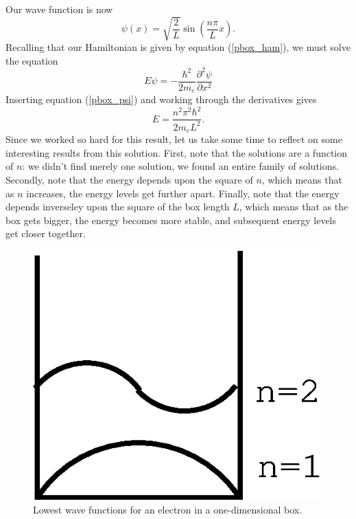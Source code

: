 Our wave function is now
\begin{equation}
	\psi(x) = \sqrt{\frac{2}{L}}\sin\left(\frac{n\pi}{L}x\right).
\label{pbox_psi}
\end{equation}
Recalling that our Hamiltonian is given by equation
(\ref{pbox_ham}), we must solve the equation
\begin{equation}
	E\psi = -\frac{\hbar^2}{2m_e}
		\frac{\partial^2\psi}{\partial x^2}
\end{equation}
Inserting equation (\ref{pbox_psi}) and working through the
derivatives gives
\begin{equation}
	E = \frac{n^2\pi^2\hbar^2}{2m_eL^2}.
\end{equation}
Since we worked so hard for this result, let us take some
time to reflect on some interesting results from this solution. First,
note that the solutions are a function of $n$: we didn't find merely
one solution, we found an entire family of solutions. Secondly, note
that the energy depends upon the square of $n$, which means that as
$n$ increases, the energy levels get further apart. Finally, note that
the energy depends inverseley upon the square of the box length $L$,
which means that as the box gets bigger, the energy becomes more
stable, and subsequent energy levels get closer together.

\begin{figure}
\begin{center}
\includegraphics[scale=0.5]{pbox_wfn2.eps}
\caption{Lowest wave functions for an electron in a one-dimensional
box.}
\label{pbox_fig}
\end{center}
\end{figure}

